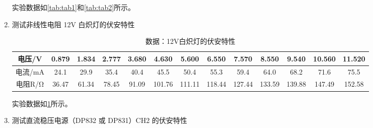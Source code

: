 \documentclass[dvipsnames, svgnames,a4paper,11pt]{article}
\begin{document}
\begin{enumerate}
		实验数据如\cref{tab:tab1}和\cref{tab:tab2}所示。
		
		\item 测试非线性电阻 12V 白炽灯的伏安特性
		

		\begin{table}[htbp]
			\centering
			\caption{数据：12V白炽灯的伏安特性}
			\label{tab:tab3}
			\small
			\begin{tabular}{|c|c|c|c|c|c|c|c|c|c|c|c|c|}
				\hline
				电压/V & 0.879 & 1.834 & 2.777 & 3.680 & 4.630 & 5.600 & 6.550 & 7.570 & 8.550 & 9.540 & 10.560 & 11.520 \\
				\hline
				电流/mA & 24.1 & 29.9 & 35.4 & 40.4 & 45.5 & 50.4 & 55.3 & 59.4 & 64.0 & 68.2 & 71.6 & 75.5 \\
				\hline
				电阻R/Ω & 36.47 & 61.34 & 78.45 & 91.09 & 101.76 & 111.11 & 118.44 & 127.44 & 133.59 & 139.88 & 147.49 & 152.58 \\
				\hline
			\end{tabular}
		\end{table}
		
		实验数据如\cref{tab:tab3}所示。
		
		\item 测试直流稳压电源（DP832 或 DP831）CH2 的伏安特性
		

\end{enumerate}
\end{document}
